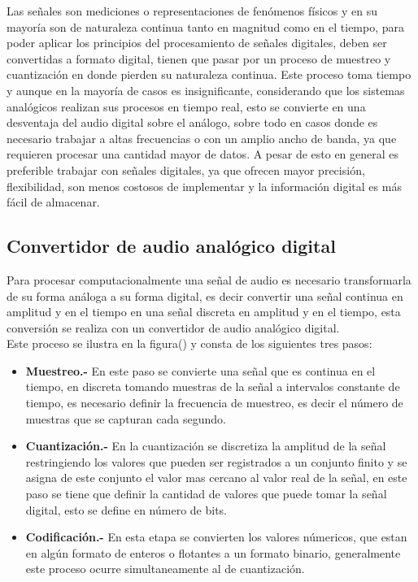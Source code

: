 Las señales son mediciones o representaciones de fen\'omenos f\'isicos y en su mayor\'ia son de naturaleza continua tanto en magnitud como en el tiempo, para poder aplicar los principios del procesamiento de señales digitales, deben ser convertidas a formato digital, tienen que pasar por un proceso de muestreo y cuantizaci\'on en donde pierden su naturaleza continua. Este proceso toma tiempo y aunque en la mayor\'ia de casos es insignificante, considerando que los sistemas anal\'ogicos realizan sus procesos en tiempo real, esto se convierte en una desventaja del audio digital sobre el an\'alogo, sobre todo en casos donde es necesario trabajar a altas frecuencias o con un amplio ancho de banda, ya que requieren procesar una cantidad mayor de datos. A pesar de esto en general es preferible trabajar con señales digitales, ya que ofrecen mayor precisi\'on, flexibilidad, son menos costosos de implementar y la informaci\'on digital es m\'as f\'acil de almacenar.\\

\subsection{Convertidor de audio anal\'ogico digital}

Para procesar computacionalmente una señal de audio es necesario transformarla de su forma an\'aloga a su forma digital, es decir convertir una señal continua en amplitud y en el tiempo en una señal discreta en amplitud y en el tiempo, esta conversi\'on se realiza con un convertidor de audio anal\'ogico digital.\\
Este proceso se ilustra en la figura() y consta de los siguientes tres pasos:\\

\begin{itemize}
	\item \textbf{Muestreo.- }En este paso se convierte una señal que es continua en el tiempo, en discreta tomando muestras de la señal a intervalos constante de tiempo, es necesario definir la frecuencia de muestreo, es decir el n\'umero de muestras que se capturan cada segundo.
	\item \textbf{Cuantizaci\'on.- }En la cuantizaci\'on se discretiza la amplitud de la señal restringiendo los valores que pueden ser registrados a un conjunto finito y se asigna de este conjunto el valor mas cercano al valor real de la señal, en este paso se tiene que definir la cantidad de valores  que puede tomar la señal digital, esto se define en n\'umero de bits.
	\item \textbf{Codificaci\'on.- }En esta etapa se convierten los valores n\'umericos, que estan en alg\'un formato de enteros o flotantes a un formato binario, generalmente este proceso ocurre simultaneamente al de cuantizaci\'on.
\end{itemize}


